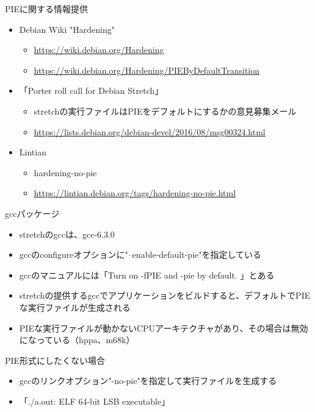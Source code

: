 \begin{frame}[containsverbatim]{PIEに関する情報提供}
  \begin{itemize}
  \item Debian Wiki "Hardening"
    \begin{itemize}
    \item \url{https://wiki.debian.org/Hardening}
    \item \url{https://wiki.debian.org/Hardening/PIEByDefaultTransition}
    \end{itemize}
  \item 「Porter roll call for Debian Stretch」
    \begin{itemize}
    \item stretchの実行ファイルはPIEをデフォルトにするかの意見募集メール
    \item \url{https://lists.debian.org/debian-devel/2016/08/msg00324.html}
    \end{itemize}
  \item Lintian
    \begin{itemize}
    \item hardening-no-pie
    \item \url{https://lintian.debian.org/tags/hardening-no-pie.html}
    \end{itemize}
  \end{itemize}
\end{frame}

\begin{frame}[containsverbatim]{gccパッケージ}
  \begin{itemize}
  \item stretchのgccは、gcc-6.3.0
  \item gccのconfigureオプションに"--enable-default-pie"を指定している
  \item gccのマニュアルには「Turn on -fPIE and -pie by default. 」とある
  \item stretchの提供するgccでアプリケーションをビルドすると、デフォルトでPIEな実行ファイルが生成される
  \item PIEな実行ファイルが動かないCPUアーキテクチャがあり、その場合は無効になっている（hppa、m68k）
  \end{itemize}
\end{frame}

\begin{frame}[containsverbatim]{PIE形式にしたくない場合}
  \begin{itemize}
  \item gccのリンクオプション"-no-pie"を指定して実行ファイルを生成する
  \item 「./a.out: ELF 64-bit LSB executable」
  \end{itemize}
\end{frame}


